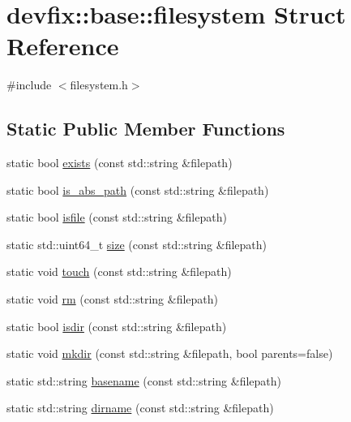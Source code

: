 \hypertarget{structdevfix_1_1base_1_1filesystem}{}\section{devfix\+:\+:base\+:\+:filesystem Struct Reference}
\label{structdevfix_1_1base_1_1filesystem}


{\ttfamily \#include $<$filesystem.\+h$>$}

\subsection*{Static Public Member Functions}
\begin{DoxyCompactItemize}
\item 
static bool \hyperlink{structdevfix_1_1base_1_1filesystem_a0b24e0dc385d1a6257adf3ece7830b7e}{exists} (const std\+::string \&filepath)
\item 
static bool \hyperlink{structdevfix_1_1base_1_1filesystem_ab83a752064650b62278367d58e12726a}{is\+\_\+abs\+\_\+path} (const std\+::string \&filepath)
\item 
static bool \hyperlink{structdevfix_1_1base_1_1filesystem_aaa31b2edd95e70979e3a932a21d28e59}{isfile} (const std\+::string \&filepath)
\item 
static std\+::uint64\+\_\+t \hyperlink{structdevfix_1_1base_1_1filesystem_a288f8ca91bb4901028307106ecd9358f}{size} (const std\+::string \&filepath)
\item 
static void \hyperlink{structdevfix_1_1base_1_1filesystem_af0b0e1daa40b7d547983d4f70bb5e3b7}{touch} (const std\+::string \&filepath)
\item 
static void \hyperlink{structdevfix_1_1base_1_1filesystem_a120ab728ac1fc842a4897571de625f6b}{rm} (const std\+::string \&filepath)
\item 
static bool \hyperlink{structdevfix_1_1base_1_1filesystem_a847752381fcd24c3fea6802b04cad5c6}{isdir} (const std\+::string \&filepath)
\item 
static void \hyperlink{structdevfix_1_1base_1_1filesystem_aabb99229325d7aafdefe857ba7317aac}{mkdir} (const std\+::string \&filepath, bool parents=false)
\item 
static std\+::string \hyperlink{structdevfix_1_1base_1_1filesystem_a93c1a012676ba19073545d6fd59d6ac3}{basename} (const std\+::string \&filepath)
\item 
static std\+::string \hyperlink{structdevfix_1_1base_1_1filesystem_a4eda25bbce0188a5b2e9899a054e0854}{dirname} (const std\+::string \&filepath)

\end{DoxyCompactItemize}
